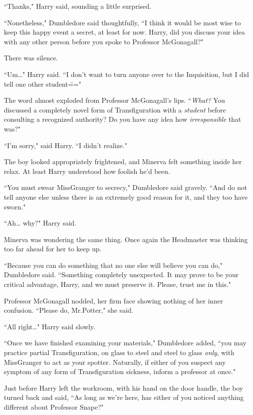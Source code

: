 ``Thanks," Harry said, sounding a little surprised.

``Nonetheless," Dumbledore said thoughtfully, ``I think it would be most wise to keep this happy event a secret, at least for now. Harry, did you discuss your idea with any other person before you spoke to Professor McGonagall?"

There was silence.

``Um{\ldots}" Harry said. ``I don't want to turn anyone over to the Inquisition, but I did tell one other student\==="

The word almost exploded from Professor McGonagall's lips. ``\emph{What?} You discussed a completely novel form of Transfiguration with a \emph{student} before consulting a recognized authority? Do you have any idea how \emph{irresponsible} that was?"

``I'm sorry," said Harry. ``I didn't realize."

The boy looked appropriately frightened, and Minerva felt something inside her relax. At least Harry understood how foolish he'd been.

``You must swear Miss\?Granger to secrecy," Dumbledore said gravely. ``And do not tell anyone else unless there is an extremely good reason for it, and they too have sworn."

``Ah{\ldots} why?" Harry said.

Minerva was wondering the same thing. Once again the Headmaster was thinking too far ahead for her to keep up.

``Because you can do something that no one else will believe you can do," Dumbledore said. ``Something completely unexpected. It may prove to be your critical advantage, Harry, and we must preserve it. Please, trust me in this."

Professor McGonagall nodded, her firm face showing nothing of her inner confusion. ``Please do, Mr.\?Potter," she said.

``All right{\ldots}" Harry said slowly.

``Once we have finished examining your materials," Dumbledore added, ``you may practice partial Transfiguration, on glass to steel and steel to glass \emph{only}, with Miss\?Granger to act as your spotter. Naturally, if either of you suspect any symptom of any form of Transfiguration sickness, inform a professor at once."

Just before Harry left the workroom, with his hand on the door handle, the boy turned back and said, ``As long as we're here, has either of you noticed anything different about Professor Snape?"

